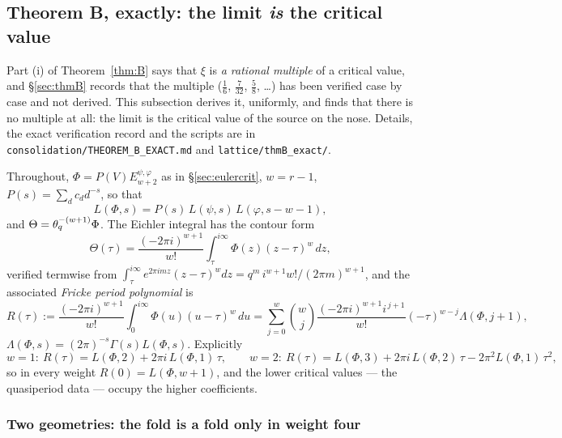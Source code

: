 \subsection{Theorem B, exactly: the limit \emph{is} the critical value}
\label{sec:thmBexact}

Part (i) of Theorem~\ref{thm:B} says that $\xi$ is \emph{a rational multiple}
of a critical value, and \S\ref{sec:thmB} records that the multiple
($\tfrac16$, $\tfrac7{32}$, $\tfrac58$, \dots) has been verified case by case
and not derived.  This subsection derives it, uniformly, and finds that there
is no multiple at all: the limit is the critical value of the source on the
nose.  Details, the exact verification record and the scripts are in
\texttt{consolidation/THEOREM\_B\_EXACT.md} and
\texttt{lattice/thmB\_exact/}.

Throughout, $\Phi=P(V)E^{\psi,\varphi}_{w+2}$ as in \S\ref{sec:eulercrit},
$w=r-1$, $P(s)=\sum_dc_dd^{-s}$, so that
\begin{equation}\label{eq:LPhifac}
L(\Phi,s)=P(s)\,L(\psi,s)\,L(\varphi,s-w-1),
\end{equation}
and $\Theta=\theta_q^{-(w+1)}\Phi$.  The Eichler integral has the contour form
\begin{equation}\label{eq:eichlerint}
\Theta(\tau)=\frac{(-2\pi i)^{w+1}}{w!}\int_\tau^{i\infty}\Phi(z)(z-\tau)^w\,dz ,
\end{equation}
verified termwise from
$\int_\tau^{i\infty}e^{2\pi imz}(z-\tau)^wdz=q^m\,i^{w+1}w!/(2\pi m)^{w+1}$,
and the associated \emph{Fricke period polynomial} is
\begin{equation}\label{eq:periodpoly}
R(\tau):=\frac{(-2\pi i)^{w+1}}{w!}\int_0^{i\infty}\Phi(u)(u-\tau)^w\,du
=\sum_{j=0}^w\binom wj\frac{(-2\pi i)^{w+1}i^{\,j+1}}{w!}(-\tau)^{w-j}\Lambda(\Phi,j+1),
\end{equation}
$\Lambda(\Phi,s)=(2\pi)^{-s}\Gamma(s)L(\Phi,s)$.  Explicitly
\begin{equation}\label{eq:Rlowweight}
w=1:\ R(\tau)=L(\Phi,2)+2\pi i\,L(\Phi,1)\,\tau,\qquad
w=2:\ R(\tau)=L(\Phi,3)+2\pi i\,L(\Phi,2)\,\tau-2\pi^2L(\Phi,1)\,\tau^2,
\end{equation}
so in every weight $R(0)=L(\Phi,w+1)$, and the lower critical values --- the
quasiperiod data --- occupy the higher coefficients.

\subsubsection*{Two geometries: the fold is a fold only in weight four}

